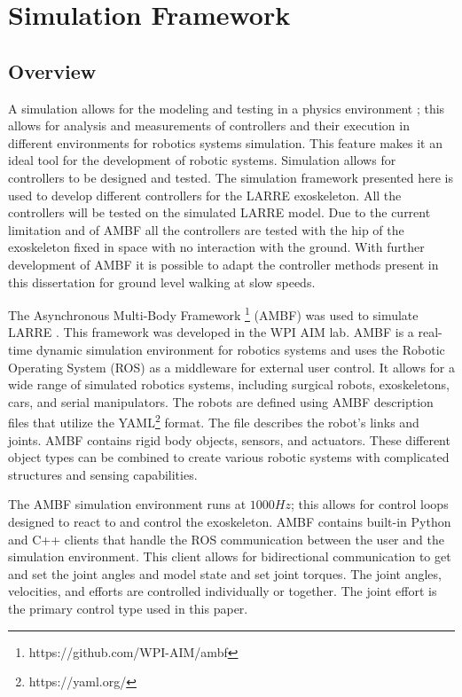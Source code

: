 \chapter{Simulation Framework}
\label{chap:sim}
\section{Overview}

A simulation allows for the modeling and testing in a physics environment \cite{vzlajpah2008simulation}; this allows for analysis and measurements of controllers and their execution in different environments for robotics systems simulation. This feature makes it an ideal tool for the development of robotic systems. Simulation allows for controllers to be designed and tested. The simulation framework presented here is used to develop different controllers for the LARRE exoskeleton. All the controllers will be tested on the simulated LARRE model. Due to the current limitation and of AMBF all the controllers are tested with the hip of the exoskeleton fixed in space with no interaction with the ground. With further development of AMBF it is possible to adapt the controller methods present in this dissertation for ground level walking at slow speeds. 

The Asynchronous Multi-Body Framework \footnote{https://github.com/WPI-AIM/ambf} (AMBF) was used to simulate LARRE \cite{AMBF}. This framework was developed in the WPI AIM lab. 
AMBF is a real-time dynamic simulation environment for robotics systems and uses the Robotic Operating System (ROS)\cite{quigley2009ros} as a middleware for external user control. It allows for a wide range of simulated robotics systems, including surgical robots, exoskeletons, cars, and serial manipulators. The robots are defined using AMBF description files that utilize the YAML\footnote{https://yaml.org/} format. The file describes the robot's links and joints. AMBF contains rigid body objects, sensors, and actuators. These different object types can be combined to create various robotic systems with complicated structures and sensing capabilities. 
 
 
 The AMBF simulation environment runs at $1000Hz$; this allows for control loops designed to react to and control the exoskeleton.  AMBF contains built-in Python and C++ clients that handle the ROS communication between the user and the simulation environment. This client allows for bidirectional communication to get and set the joint angles and model state and set joint torques. The joint angles, velocities, and efforts are controlled individually or together. The joint effort is the primary control type used in this paper. 
 
